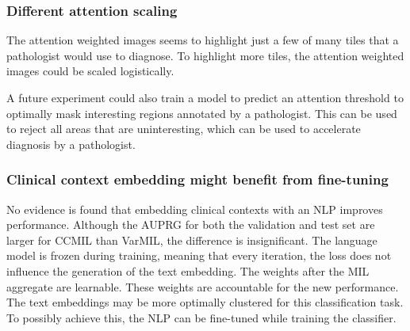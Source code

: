 \subsubsection{Different attention scaling}
The attention weighted images seems to highlight just a few of many tiles that a pathologist would use to diagnose.
To highlight more tiles, the attention weighted images could be scaled logistically.

A future experiment could also train a model to predict an attention threshold to optimally mask interesting regions annotated by a pathologist.
This can be used to reject all areas that are uninteresting, which can be used to accelerate diagnosis by a pathologist.

\subsubsection{Clinical context embedding might benefit from fine-tuning}
No evidence is found that embedding clinical contexts with an NLP improves performance.
Although the AUPRG for both the validation and test set are larger for CCMIL than VarMIL, the difference is insignificant.
The language model is frozen during training, meaning that every iteration, the loss does not influence the generation of the text embedding.
The weights after the MIL aggregate are learnable.
These weights are accountable for the new performance.
The text embeddings may be more optimally clustered for this classification task.
To possibly achieve this, the NLP can be fine-tuned while training the classifier.
